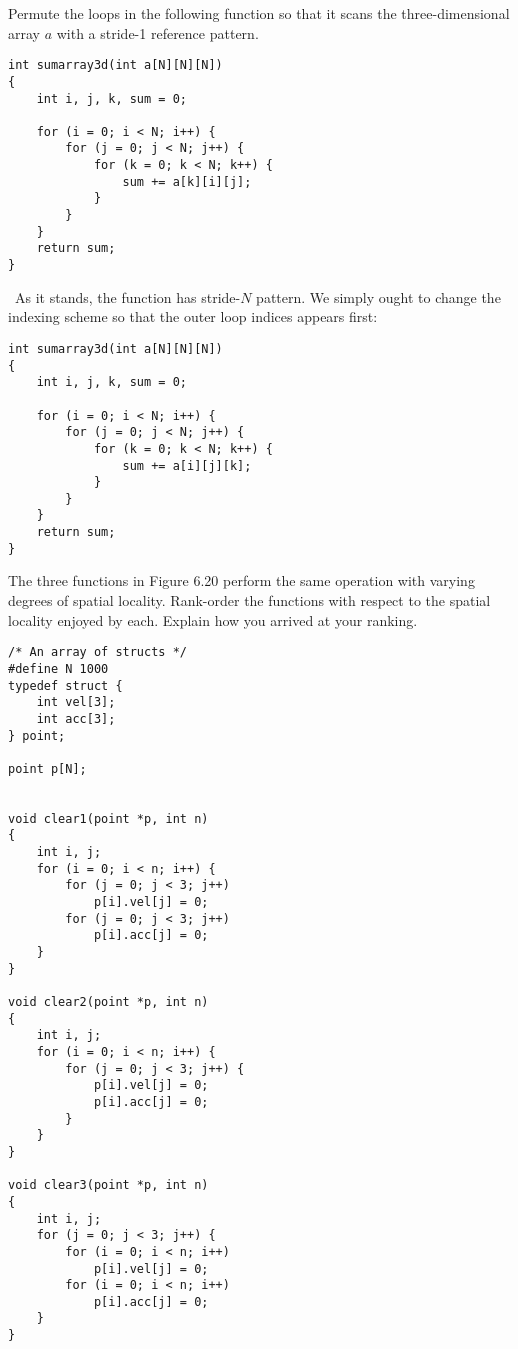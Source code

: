 \documentclass[12pt]{article}
\newenvironment{ex}[2][Exercise]{\begin{trivlist}
		\item[\hskip \labelsep {\bfseries #1}\hskip \labelsep {\bfseries #2.}]}{\end{trivlist}}
\newenvironment{sol}[1][Solution]{\begin{trivlist}
		\item[\hskip \labelsep {\bfseries #1:}]}{\end{trivlist}}
\begin{document}
\begin{ex}{6.7}
	Permute the loops in the following function so that it scans the three-dimensional
	array $a$ with a stride-1 reference pattern.
	\begin{lstlisting}
int sumarray3d(int a[N][N][N])
{
	int i, j, k, sum = 0;
	
	for (i = 0; i < N; i++) {
		for (j = 0; j < N; j++) {
			for (k = 0; k < N; k++) {
				sum += a[k][i][j];
			}
		}
	}
	return sum;
}
	\end{lstlisting}
\end{ex}

\begin{sol}
	\
	As it stands, the function has stride-$N$ pattern. We simply ought to change the indexing
	scheme so that the outer loop indices appears first:
	\begin{lstlisting}
int sumarray3d(int a[N][N][N])
{
	int i, j, k, sum = 0;
	
	for (i = 0; i < N; i++) {
		for (j = 0; j < N; j++) {
			for (k = 0; k < N; k++) {
				sum += a[i][j][k];
			}
		}
	}
	return sum;
}
	\end{lstlisting}
\end{sol}

\begin{ex}{6.8}
	The three functions in Figure 6.20 perform the same operation with varying degrees
	of spatial locality. Rank-order the functions with respect to the spatial locality
	enjoyed by each. Explain how you arrived at your ranking.
	\begin{lstlisting}
/* An array of structs */
#define N 1000
typedef struct {
	int vel[3];
	int acc[3];
} point;

point p[N];


void clear1(point *p, int n)
{
	int i, j;
	for (i = 0; i < n; i++) {
		for (j = 0; j < 3; j++)
			p[i].vel[j] = 0;
		for (j = 0; j < 3; j++)
			p[i].acc[j] = 0;
	}
}

void clear2(point *p, int n)
{
	int i, j;
	for (i = 0; i < n; i++) {
		for (j = 0; j < 3; j++) {
			p[i].vel[j] = 0;
			p[i].acc[j] = 0;
		}
	}
}

void clear3(point *p, int n)
{
	int i, j;
	for (j = 0; j < 3; j++) {
		for (i = 0; i < n; i++)
			p[i].vel[j] = 0;
		for (i = 0; i < n; i++)
			p[i].acc[j] = 0;
	}
}
	\end{lstlisting}
\end{ex}
\end{document}
